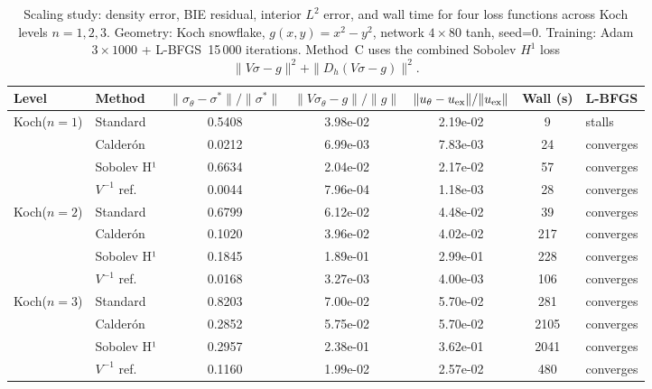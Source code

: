 \begin{table}[ht]
\centering
\caption{Scaling study: density error, BIE residual, interior $L^2$ error, and wall time for four loss functions across Koch levels $n=1,2,3$. Geometry: Koch snowflake, $g(x,y)=x^2-y^2$, network $4\times80$ tanh, seed=0. Training: Adam $3\times1000$ + L-BFGS~15\,000 iterations. Method~C uses the combined Sobolev $H^1$ loss $\|V\sigma-g\|^2 + \|D_h(V\sigma-g)\|^2$.}
\label{tab:scaling_main}
\begin{tabular}{@{}llccccl@{}}
\toprule
Level & Method & $\|\sigma_\theta-\sigma^*\|/\|\sigma^*\|$ & $\|V\sigma_\theta-g\|/\|g\|$ & $\|u_\theta-u_{\rm ex}\|/\|u_{\rm ex}\|$ & Wall (s) & L-BFGS \\
\midrule
  Koch($n=1$) & Standard & 0.5408 & 3.98e-02 & 2.19e-02 & 9 & stalls \\
   & Calderón & 0.0212 & 6.99e-03 & 7.83e-03 & 24 & converges \\
   & Sobolev H¹ & 0.6634 & 2.04e-02 & 2.17e-02 & 57 & converges \\
   & $V^{-1}$ ref. & 0.0044 & 7.96e-04 & 1.18e-03 & 28 & converges \\
\midrule
  Koch($n=2$) & Standard & 0.6799 & 6.12e-02 & 4.48e-02 & 39 & converges \\
   & Calderón & 0.1020 & 3.96e-02 & 4.02e-02 & 217 & converges \\
   & Sobolev H¹ & 0.1845 & 1.89e-01 & 2.99e-01 & 228 & converges \\
   & $V^{-1}$ ref. & 0.0168 & 3.27e-03 & 4.00e-03 & 106 & converges \\
\midrule
  Koch($n=3$) & Standard & 0.8203 & 7.00e-02 & 5.70e-02 & 281 & converges \\
   & Calderón & 0.2852 & 5.75e-02 & 5.70e-02 & 2105 & converges \\
   & Sobolev H¹ & 0.2957 & 2.38e-01 & 3.62e-01 & 2041 & converges \\
   & $V^{-1}$ ref. & 0.1160 & 1.99e-02 & 2.57e-02 & 480 & converges \\
\bottomrule
\end{tabular}
\end{table}